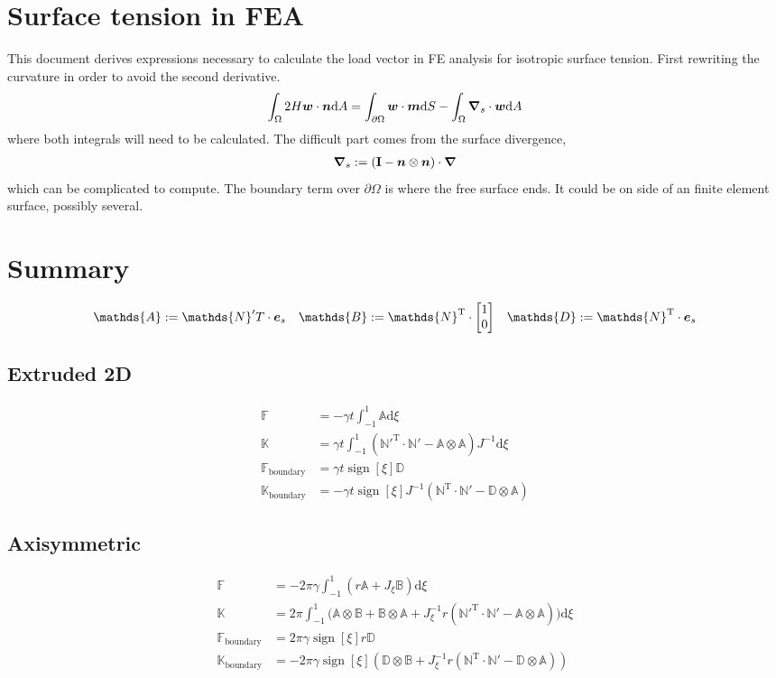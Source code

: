 \documentclass[a4paper,11pt]{article}
\renewcommand{\to}[1]{\text{\boldmath $#1$}} %
\newcommand{\ts}[1]{\text{\boldmath $\mathrm{#1}$}} %
\newcommand{\uv}[1]{\mathds{#1}}
\newcommand{\um}[1]{\mathds{#1}}
\newcommand{\intd}[1]{\mathrm{d}#1}
\newcommand{\T}{\mathrm{T}}
\newcommand{\defeq}{:=}
\newcommand{\boundary}{\text{boundary}}
\DeclareMathOperator{\sign}{sign}
\begin{document}
\section{Surface tension in FEA}
This document derives expressions necessary to calculate the load vector in FE analysis for isotropic surface tension. First rewriting the curvature in order to avoid the second derivative.
\begin{align}
 \int_\Omega 2 H \to w\cdot \to n\intd A = \int_{\partial\Omega} \to w\cdot\to m\intd S - \int_\Omega \to \nabla_s \cdot \to w \intd A
 \label{eq:curvature} 
\end{align}
where both integrals will need to be calculated. The difficult part comes from the surface divergence,
\begin{align}
 \to \nabla_s \defeq \left(\ts I - \to n\otimes\to n \right)\cdot \to \nabla
\end{align}
which can be complicated to compute. The boundary term over $\partial\Omega$ is where the free surface ends. It could be on side of an finite element surface, possibly several.

\section{Summary}
\begin{align}
\uv A &\defeq {\um N}'^\T \cdot \to e_s & \uv B &\defeq {\um N}^\T \cdot \begin{bmatrix}1\\0\end{bmatrix} & \uv D \defeq \uv N^\T \cdot \to e_s
\end{align}
\subsection{Extruded 2D}
\begin{align}
 \uv F &= -\gamma t \int_{-1}^{1} \uv A \intd\xi\\
 \um K &= \gamma t \int_{-1}^{1} \left(\um N'^\T\cdot\um N' - \uv A\otimes\uv A\right) J^{-1} \intd\xi\\
 \uv F_\boundary &= \gamma t \sign[\xi] \uv D\\
 \um K_\boundary &= -\gamma t \sign[\xi]J^{-1} (\um N^\T \cdot \um N'- \uv D\otimes \uv A)
\end{align}

\subsection{Axisymmetric}
\begin{align}
  \uv F &= -2\pi \gamma \int_{-1}^{1} \left(r\uv A + J_\xi\uv B\right) \intd\xi\\
  \um K &= 2\pi \int_{-1}^{1} \bigg(
	\uv A \otimes \uv B +
	\uv B\otimes \uv A +
	J_\xi^{-1} r({\um N}'^\T \cdot {\um N}' - \uv A\otimes \uv A)
	\bigg)\intd\xi\\
 \uv F_\boundary &= 2\pi\gamma\sign[\xi] r \uv D\\
 \um K_\boundary &= -2 \pi \gamma\sign[\xi] \left(\uv D\otimes\uv B + J_\xi^{-1} r \left(\um N^\T\cdot\um N' -\uv D\otimes\uv A\right) \right)
\end{align}
\end{document}
